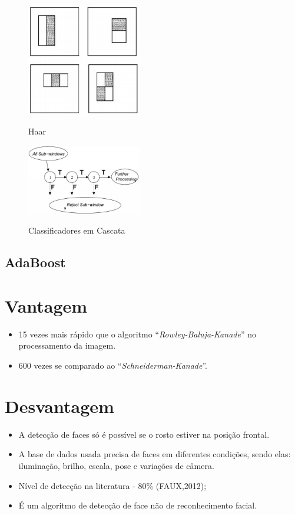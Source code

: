 \documentclass[12pt,a4paper]{article}
\begin{document}
\begin{figure}[h!]
\centering
\includegraphics[width=5cm]{recursos/imagens/Haar.png}
\label{4}
\caption{Haar}
\end{figure} 

\begin{figure}[h!]
\centering
\includegraphics[width=5cm]{recursos/imagens/cascata.png}
\label{4}
\caption{Classificadores em Cascata}
\end{figure} 



\subsection{AdaBoost}







\section{Vantagem}
\begin{itemize}
	\item 15 vezes mais rápido que o algoritmo “\textit{Rowley-Baluja-Kanade}” no processamento da imagem.

	\item 600 vezes se comparado ao “\textit{Schneiderman-Kanade}”.
\end{itemize}

\section{Desvantagem}
\begin{itemize}
	\item A detecção de faces só é possível se o rosto estiver na posição frontal.
	\item A base de dados usada precisa de faces em diferentes condições, sendo elas: iluminação, brilho, escala, pose e variações de câmera.
	\item Nível de detecção na literatura - 80\% (FAUX,2012);
	\item É um algoritmo de detecção de face não de reconhecimento facial.
\end{itemize}
\end{document}
